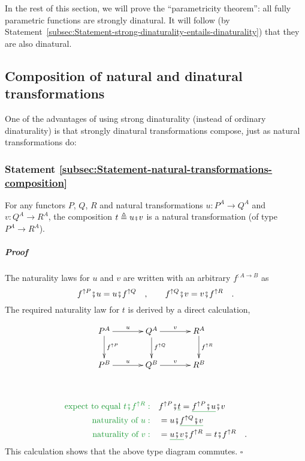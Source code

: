In the rest of this section, we will prove the \textsf{``}parametricity theorem\textsf{''}:
all fully parametric functions are strongly dinatural. It will follow
(by Statement~\ref{subsec:Statement-strong-dinaturality-entails-dinaturality})
that they are also dinatural.

\subsection{Composition of natural and dinatural transformations}

One of the advantages of using strong dinaturality (instead of ordinary
dinaturality) is that strongly dinatural transformations compose,
just as natural transformations do:

\subsubsection{Statement \label{subsec:Statement-natural-transformations-composition}\ref{subsec:Statement-natural-transformations-composition}}

For any functors $P$, $Q$, $R$ and natural transformations $u:P^{A}\rightarrow Q^{A}$
and $v:Q^{A}\rightarrow R^{A}$, the composition $t\triangleq u\bef v$
is a natural transformation (of type $P^{A}\rightarrow R^{A}$).

\subparagraph{Proof}

The naturality laws for $u$ and $v$ are written with an arbitrary
$f^{:A\rightarrow B}$ as
\[
f^{\uparrow P}\bef u=u\bef f^{\uparrow Q}\quad,\quad\quad f^{\uparrow Q}\bef v=v\bef f^{\uparrow R}\quad.
\]
The required naturality law for $t$ is derived by a direct calculation,

\begin{wrapfigure}[6]{l}{0.4\columnwidth}%
\vspace{-1.5\baselineskip}
\[
\xymatrix{\xyScaleY{2.0pc}\xyScaleX{3.0pc}P^{A}\ar[d]\sp(0.45){f^{\uparrow P}}\ar[r]\sp(0.5){u} & Q^{A}\ar[d]\sp(0.45){f^{\uparrow Q}}\ar[r]\sp(0.5){v} & R^{A}\ar[d]\sp(0.45){f^{\uparrow R}}\\
P^{B}\ar[r]\sp(0.5){u} & Q^{B}\ar[r]\sp(0.5){v} & R^{B}
}
\]

\vspace{-0\baselineskip}
\end{wrapfigure}%

~\vspace{-1.8\baselineskip}

\begin{align*}
{\color{greenunder}\text{expect to equal }t\bef f^{\uparrow R}:}\quad & f^{\uparrow P}\bef\gunderline t=\gunderline{f^{\uparrow P}\bef u}\bef v\\
{\color{greenunder}\text{naturality of }u:}\quad & =u\bef\gunderline{f^{\uparrow Q}\bef v}\\
{\color{greenunder}\text{naturality of }v:}\quad & =\gunderline{u\bef v}\bef f^{\uparrow R}=t\bef f^{\uparrow R}\quad.
\end{align*}
This calculation shows that the above type diagram commutes. $\square$

